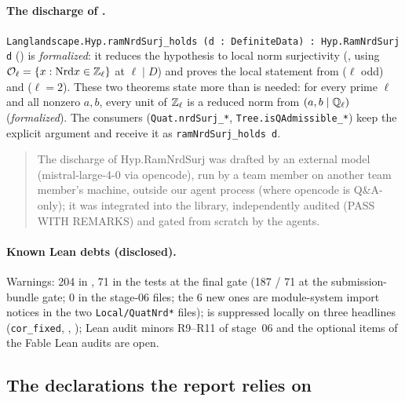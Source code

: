 \paragraph{The discharge of .} \texttt{Langlandscape.Hyp.ramNrdSurj\_holds (d : DefiniteData) :
Hyp.RamNrdSurj d} () is \emph{formalized}: it reduces the hypothesis to local norm
surjectivity (, using $\mathcal{O}_\ell=\{x:\mathrm{Nrd} x\in\mathbb{Z}_\ell\}$ at $\ell\mid D$) and proves the
local statement from  ($\ell$ odd) and 
($\ell=2$). These two theorems state more than is needed: for every prime $\ell$ and all nonzero $a,b$, every unit of
$\mathbb{Z}_\ell$ is a reduced norm from $(a,b\mid\mathbb{Q}_\ell)$ (\emph{formalized}). The consumers (\texttt{Quat.nrdSurj\_*},
\texttt{Tree.isQAdmissible\_*}) keep the explicit argument and receive it as \texttt{ramNrdSurj\_holds d}.
\begin{quote}\small
The discharge of Hyp.RamNrdSurj was drafted by an external model (mistral-large-4-0 via opencode), run by a team member on another team member's machine, outside our agent process (where opencode is Q\&A-only); it was integrated into the library, independently audited (PASS WITH REMARKS) and gated from scratch by the agents.
\end{quote}

\paragraph{Known Lean debts (disclosed).} Warnings: 204 in , 71 in the tests at the final gate
(187 / 71 at the submission-bundle gate; 0 in the stage-06 files; the 6 new ones are module-system import notices in the two \texttt{Local/QuatNrd*} files);  is suppressed locally on three headlines
(\texttt{cor\_fixed}, , ); Lean audit minors R9--R11 of stage~06 and the
optional items of the Fable Lean audits are open.

\subsection{The declarations the report relies on}\label{ss:lean-tables}

